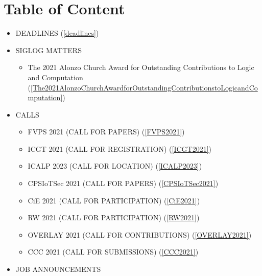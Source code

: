 \documentclass[prodmode,acmtecs]{acmsmall} %
\begin{document}
\section{Table of Content}\begin{itemize}\item DEADLINES (\cref{deadlines}) 
 
\item SIGLOG MATTERS 
 
\begin{itemize}\item The 2021 Alonzo Church Award for Outstanding Contributions to Logic and Computation (\cref{The2021AlonzoChurchAwardforOutstandingContributionstoLogicandComputation})
\end{itemize} 
\item CALLS 
 
\begin{itemize}\item FVPS 2021 (CALL FOR PAPERS) (\cref{FVPS2021})
\item ICGT 2021 (CALL FOR REGISTRATION) (\cref{ICGT2021})
\item ICALP 2023 (CALL FOR LOCATION) (\cref{ICALP2023})
\item CPSIoTSec 2021 (CALL FOR PAPERS) (\cref{CPSIoTSec2021})
\item CiE 2021 (CALL FOR PARTICIPATION) (\cref{CiE2021})
\item RW 2021 (CALL FOR PARTICIPATION) (\cref{RW2021})
\item OVERLAY 2021 (CALL FOR CONTRIBUTIONS) (\cref{OVERLAY2021})
\item CCC 2021 (CALL FOR SUBMISSIONS) (\cref{CCC2021})
\end{itemize} 
\item JOB ANNOUNCEMENTS 
 

\end{itemize}
\end{document}
